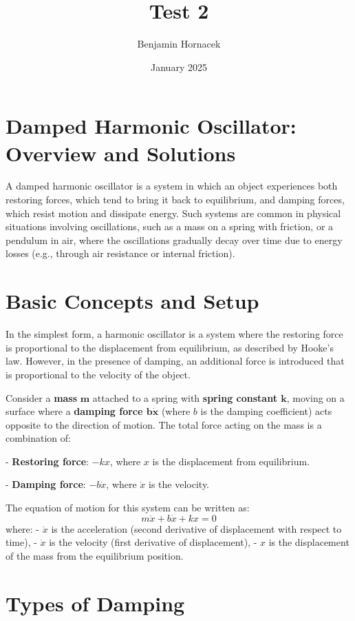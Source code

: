 \documentclass{article}
\title{Test 2}
\author{Benjamin Hornacek}
\date{January 2025}
\begin{document}
\maketitle
\section*{Damped Harmonic Oscillator: Overview and Solutions}


A damped harmonic oscillator is a system in which an object experiences both restoring forces, which tend to bring it back to equilibrium, and damping forces, which resist motion and dissipate energy. Such systems are common in physical situations involving oscillations, such as a mass on a spring with friction, or a pendulum in air, where the oscillations gradually decay over time due to energy losses (e.g., through air resistance or internal friction).

\section{Basic Concepts and Setup}

In the simplest form, a harmonic oscillator is a system where the restoring force is proportional to the displacement from equilibrium, as described by Hooke's law. However, in the presence of damping, an additional force is introduced that is proportional to the velocity of the object.

Consider a \textbf{mass} \( \mathbf{m} \) attached to a spring with \textbf{spring constant \( \mathbf{k} \)}, moving on a surface where a \textbf{damping force \( \mathbf{b\dot{x}} \)} (where \( b \) is the damping coefficient) acts opposite to the direction of motion. The total force acting on the mass is a combination of:

- \textbf{Restoring force}: \( -kx \), where \( x \) is the displacement from equilibrium.

- \textbf{Damping force}: \( -b \dot{x} \), where \( \dot{x} \) is the velocity.

The equation of motion for this system can be written as:
\[
m \ddot{x} + b \dot{x} + kx = 0
\]
where:
- \( \ddot{x} \) is the acceleration (second derivative of displacement with respect to time),
- \( \dot{x} \) is the velocity (first derivative of displacement),
- \( x \) is the displacement of the mass from the equilibrium position.

\section{Types of Damping}
\end{document}
